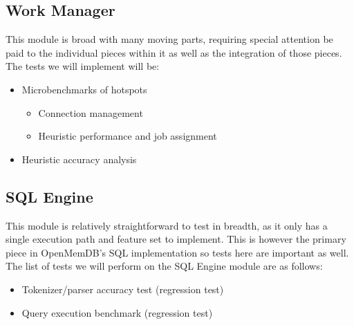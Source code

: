 \documentclass[letterpaper, 11pt]{article}
\begin{document}
\subsection{Work Manager}
This module is broad with many moving parts, requiring special attention be paid to the individual
pieces within it as well as the integration of those pieces. The tests we will implement will be:
\begin{itemize}
 \item Microbenchmarks of hotspots
 \begin{itemize}
  \item Connection management
  \item Heuristic performance and job assignment
 \end{itemize}
 \item Heuristic accuracy analysis

\end{itemize}

\subsection{SQL Engine}
This module is relatively straightforward to test in breadth, as it only has a single execution path
and feature set to implement. This is however the primary piece in OpenMemDB's SQL implementation
so tests here are important as well. The list of tests we will perform on the SQL Engine module are
as follows:
\begin{itemize}
 \item Tokenizer/parser accuracy test (regression test)
 \item Query execution benchmark (regression test)
\end{itemize}
\end{document}
